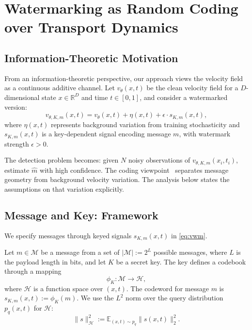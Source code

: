\documentclass[11pt]{article}
\begin{document}
\section{Watermarking as Random Coding over Transport Dynamics}
\label{sec:wmrc}
\subsection{Information-Theoretic Motivation}

From an information-theoretic perspective, our approach views the velocity
field as a continuous additive channel. Let $v_\theta(x,t)$ be the clean
velocity field for a $D$-dimensional state $x\in\mathbb R^D$ and time
$t\in[0,1]$, and consider a watermarked version:
\begin{equation}\label{eq:vwm}
v_{\theta,K,m}(x,t) = v_\theta(x,t) + \eta(x,t) + \epsilon \cdot s_{K,m}(x,t),
\end{equation}
where $\eta(x,t)$ represents background variation from training
stochasticity and $s_{K,m}(x,t)$ is a key-dependent signal encoding
message $m$, with watermark strength $\epsilon>0$.

The detection problem becomes: given $N$ noisy observations of
$v_{\theta,K,m}(x_i,t_i)$, estimate $\hat{m}$ with high confidence.
The coding viewpoint~\cite{cover1999elements} separates message
geometry from background velocity variation. The analysis below states
the assumptions on that variation explicitly.

\subsection{Message and Key: Framework}

We specify messages through keyed signals $s_{K,m}(x,t)$ in
\eqref{eq:vwm}.

Let $m \in \mathcal{M}$ be a message from a set of
$|\mathcal{M}| := 2^L$ possible messages, where $L$ is the payload length
in bits, and let $K$ be a secret key.
The key defines a codebook through a mapping
\begin{equation}
\phi_K : \mathcal{M} \to \mathcal{H},
\end{equation}
where $\mathcal{H}$ is a function space over $(x,t)$. The codeword for
message $m$ is $s_{K,m}(x,t) := \phi_K(m)$. We use the
$L^2$ norm over the query distribution $p_q(x,t)$ for $\mathcal H$:
\[
\|s\|_{\mathcal H}^2:=\mathbb E_{(x,t)\sim p_q}\|s(x,t)\|_2^2.
\]
\end{document}

